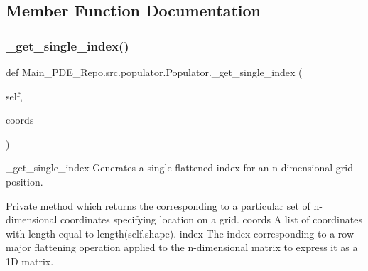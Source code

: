 \subsection{Member Function Documentation}
\mbox{\label{classMain__PDE__Repo_1_1src_1_1populator_1_1Populator_aabb6d0bae97c41cc83ec81dd5f958fa3}} 
\subsubsection{\texorpdfstring{\+\_\+get\+\_\+single\+\_\+index()}{\_get\_single\_index()}}
{\footnotesize\ttfamily def Main\+\_\+\+P\+D\+E\+\_\+\+Repo.\+src.\+populator.\+Populator.\+\_\+get\+\_\+single\+\_\+index (\begin{DoxyParamCaption}\item[{}]{self,  }\item[{}]{coords }\end{DoxyParamCaption})\hspace{0.3cm}{\ttfamily [private]}}



\+\_\+get\+\_\+single\+\_\+index Generates a single flattened index for an n-\/dimensional grid position. 

Private method which returns the corresponding to a particular set of n-\/dimensional coordinates specifying location on a grid.  coords A list of coordinates with length equal to length(self.\+shape).  index The index corresponding to a row-\/major flattening operation applied to the n-\/dimensional matrix to express it as a 1D matrix. \mbox{\label{classMain__PDE__Repo_1_1src_1_1populator_1_1Populator_ab94a2b5767f776c3a4b62b161a071828}} 
